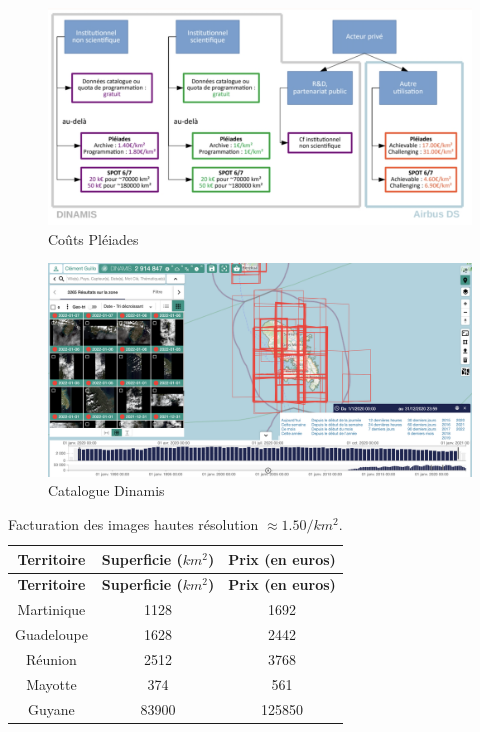 \documentclass[
  letterpaper,
  DIV=11,
  numbers=noendperiod]{scrreprt}
\begin{document}
\begin{figure}[H]

{\centering \includegraphics{figures/couts_pleiades.png}

}

\caption{\label{fig-pleiade-cost}Coûts Pléiades}

\end{figure}

\begin{figure}[H]

{\centering \includegraphics{figures/ElCatalogue.png}

}

\caption{\label{fig-catalogue}Catalogue Dinamis}

\end{figure}

\begin{longtable}[]{@{}ccc@{}}
\caption{Facturation des images hautes résolution
\(\approx 1.50 / km^2\).}\tabularnewline
\toprule\noalign{}
\textbf{Territoire} & \textbf{Superficie (\(km^2\))} & \textbf{Prix (en
euros)} \\
\midrule\noalign{}
\endfirsthead
\toprule\noalign{}
\textbf{Territoire} & \textbf{Superficie (\(km^2\))} & \textbf{Prix (en
euros)} \\
\midrule\noalign{}
\endhead
\bottomrule\noalign{}
\endlastfoot
Martinique & 1128 & 1692 \\
Guadeloupe & 1628 & 2442 \\
Réunion & 2512 & 3768 \\
Mayotte & 374 & 561 \\
Guyane & 83900 & 125850 \\
\end{longtable}
\end{document}
